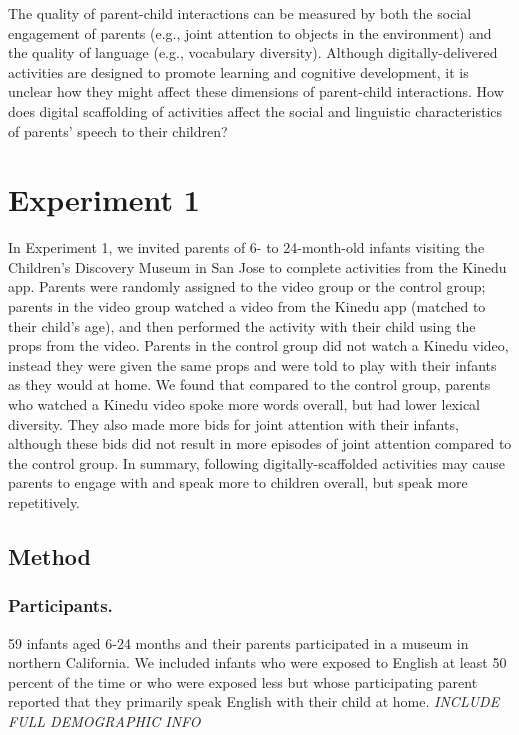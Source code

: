 \documentclass[10pt, letterpaper]{article}
\begin{document}
The quality of parent-child interactions can be measured by both the
social engagement of parents (e.g., joint attention to objects in the
environment) and the quality of language (e.g., vocabulary diversity).
Although digitally-delivered activities are designed to promote learning
and cognitive development, it is unclear how they might affect these
dimensions of parent-child interactions. How does digital scaffolding of
activities affect the social and linguistic characteristics of parents'
speech to their children?

\section{Experiment 1}\label{experiment-1}

In Experiment 1, we invited parents of 6- to 24-month-old infants
visiting the Children's Discovery Museum in San Jose to complete
activities from the Kinedu app. Parents were randomly assigned to the
video group or the control group; parents in the video group watched a
video from the Kinedu app (matched to their child's age), and then
performed the activity with their child using the props from the video.
Parents in the control group did not watch a Kinedu video, instead they
were given the same props and were told to play with their infants as
they would at home. We found that compared to the control group, parents
who watched a Kinedu video spoke more words overall, but had lower
lexical diversity. They also made more bids for joint attention with
their infants, although these bids did not result in more episodes of
joint attention compared to the control group. In summary, following
digitally-scaffolded activities may cause parents to engage with and
speak more to children overall, but speak more repetitively.

\subsection{Method}\label{method}

\subsubsection{Participants.}\label{participants.}

59 infants aged 6-24 months and their parents participated in a museum
in northern California. We included infants who were exposed to English
at least 50 percent of the time or who were exposed less but whose
participating parent reported that they primarily speak English with
their child at home. \emph{INCLUDE FULL DEMOGRAPHIC INFO}
\end{document}

